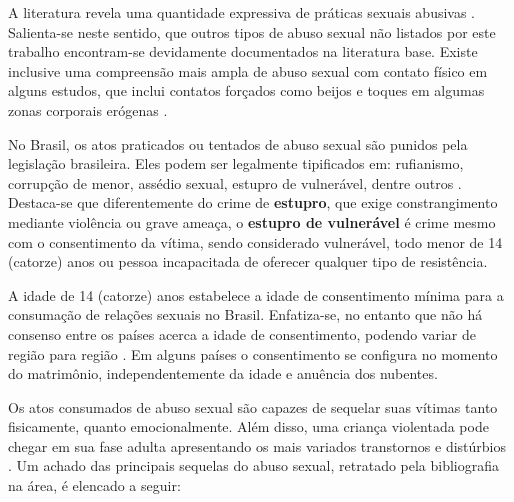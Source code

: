 \begin{parcolumns}[sloppy, distance=3em, colwidths={2=0.5\textwidth}]{2}
	\colplacechunks

\end{parcolumns}

\newpage

A literatura revela uma quantidade expressiva de práticas sexuais abusivas \cite{brasil2002notificacao, habigzang2005abuso, sayao2006refazendo, santos2011guia, ibiapina2013influencias, lima2013violencia, lima2015violencia, barros2016participaccao, brasil2018violencia}. Salienta-se neste sentido, que outros tipos de abuso sexual não listados por este trabalho encontram-se devidamente documentados na literatura base. Existe inclusive uma compreensão mais ampla de abuso sexual com contato físico em alguns estudos, que inclui contatos forçados como beijos e toques em algumas zonas corporais erógenas \cite{sayao2006refazendo, santos2009guia}.

No Brasil, os atos praticados ou tentados de abuso sexual são punidos pela legislação brasileira. Eles podem ser legalmente tipificados em: rufianismo, corrupção de menor, assédio sexual, estupro de vulnerável, dentre outros \cite{Lei:12015:2009}. Destaca-se que diferentemente do crime de \textbf{estupro}, que exige constrangimento mediante violência ou grave ameaça, o \textbf{estupro de vulnerável} é crime mesmo com o consentimento da vítima, sendo considerado vulnerável, todo menor de 14 (catorze) anos ou pessoa incapacitada de oferecer qualquer tipo de resistência. 

A idade de 14 (catorze) anos estabelece a idade de consentimento mínima para a consumação de relações sexuais no Brasil. Enfatiza-se, no entanto que não há consenso entre os países acerca a idade de consentimento, podendo variar de região para região \cite{waites2005age}. Em alguns países o consentimento se configura no momento do matrimônio, independentemente da idade e anuência dos nubentes. 

Os atos consumados de abuso sexual são capazes de sequelar suas vítimas tanto fisicamente, quanto emocionalmente. Além disso, uma criança violentada pode chegar em sua fase adulta apresentando os mais variados transtornos e distúrbios \cite{mariscal2003programa, OMS2017responding}. Um achado das principais sequelas do abuso sexual, retratado pela bibliografia na área, é elencado a seguir:

